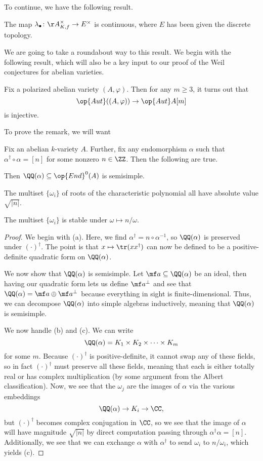 \documentclass[../notes.tex]{subfiles}
\begin{document}
To continue, we have the following result.
\begin{proposition} \label{prop:get-hecke-char}
	The map $\lambda_\bullet\colon\AA_{K,f}^\times\to E^\times$ is continuous, where $E$ has been given the discrete topology.
\end{proposition}
We are going to take a roundabout way to this result. We begin with the following result, which will also be a key input to our proof of the Weil conjectures for abelian varieties.
\begin{remark}
	 Fix a polarized abelian variety $(A,\varphi)$. Then for any $m\ge3$, it turns out that
	\[\op{Aut}((A,\varphi))\to\op{Aut}A[m]\]
	is injective. 
\end{remark}
To prove the remark, we will want 
\begin{proposition}
	Fix an abelian $k$-variety $A$. Further, fix any endomorphism $\alpha$ such that $\alpha^\dagger\circ\alpha=[n]$ for some nonzero $n\in\ZZ$. Then the following are true.
	\begin{listalph}
		\item Then $\QQ(\alpha)\subseteq\op{End}^0(A)$ is semisimple.
		\item The multiset $\{\omega_i\}$ of roots of the characteristic polynomial all have absolute value $\sqrt {\left|n\right|}$.
		\item The multiset $\{\omega_i\}$ is stable under $\omega\mapsto n/\omega$.
	\end{listalph}
\end{proposition}
\begin{proof}
	We begin with (a). Here, we find $\alpha^\dagger=n\circ\alpha^{-1}$, so $\QQ(\alpha)$ is preserved under $(\cdot)^\dagger$. The point is that $x\mapsto\tr(xx^\dagger)$ can now be defined to be a positive-definite quadratic form on $\QQ(\alpha)$.
	
	We now show that $\QQ(\alpha)$ is semisimple. Let $\mf a\subseteq\QQ(\alpha)$ be an ideal, then having our quadratic form lets us define $\mf a^\perp$ and see that $\QQ(\alpha)=\mf a\oplus\mf a^\perp$ because everything in sight is finite-dimensional. Thus, we can decompose $\QQ(\alpha)$ into simple algebras inductively, meaning that $\QQ(\alpha)$ is semisimple.

	We now handle (b) and (c). We can write
	\[\QQ(\alpha)=K_1\times K_2\times\cdots\times K_m\]
	for some $m$. Because $(\cdot)^\dagger$ is positive-definite, it cannot swap any of these fields, so in fact $(\cdot)^\dagger$ must preserve all these fields, meaning that each is either totally real or has complex multiplication (by some argument from the Albert classification). Now, we see that the $\omega_j$ are the images of $\alpha$ via the various embeddings
	\[\QQ(\alpha)\to K_i\to\CC,\]
	but $(\cdot)^\dagger$ becomes complex conjugation in $\CC$, so we see that the image of $\alpha$ will have magnitude $\sqrt{\left|n\right|}$ by direct computation passing through $\alpha^\dagger\alpha=[n]$. Additionally, we see that we can exchange $\alpha$ with $\alpha^\dagger$ to send $\omega_i$ to $n/\omega_i$, which yields (c).
\end{proof}
\end{document}
